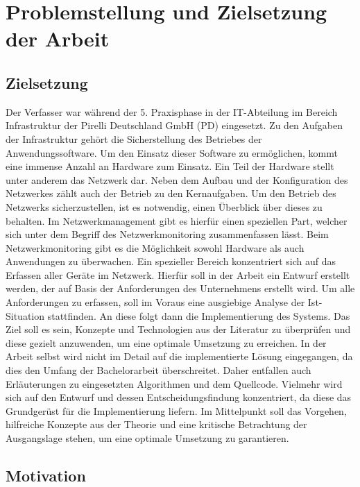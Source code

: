 \chapter{Problemstellung und Zielsetzung der Arbeit}
\label{cha:Einleitung}

\section{Zielsetzung}

Der Verfasser war während der 5. Praxisphase in der IT-Abteilung im Bereich Infrastruktur der Pirelli Deutschland GmbH (PD) eingesetzt.
Zu den Aufgaben der Infrastruktur gehört die Sicherstellung des Betriebes der Anwendungssoftware.
Um den Einsatz dieser Software zu ermöglichen, kommt eine immense Anzahl an Hardware zum Einsatz.
Ein Teil der Hardware stellt unter anderem das Netzwerk dar.
Neben dem Aufbau und der Konfiguration des Netzwerkes zählt auch der Betrieb zu den Kernaufgaben.
Um den Betrieb des Netzwerks sicherzustellen, ist es notwendig, einen Überblick über dieses zu behalten.
Im Netzwerkmanagement gibt es hierfür einen speziellen Part, welcher sich unter dem Begriff des Netzwerkmonitoring zusammenfassen lässt.
Beim Netzwerkmonitoring gibt es die Möglichkeit sowohl Hardware als auch Anwendungen zu überwachen.
Ein spezieller Bereich konzentriert sich auf das Erfassen aller Geräte im Netzwerk.
Hierfür soll in der Arbeit ein Entwurf erstellt werden, der auf Basis der Anforderungen des Unternehmens erstellt wird.
Um alle Anforderungen zu erfassen, soll im Voraus eine ausgiebige Analyse der Ist-Situation stattfinden.
An diese folgt dann die Implementierung des Systems.
Das Ziel soll es sein, Konzepte und Technologien aus der Literatur zu überprüfen und diese gezielt anzuwenden, um eine optimale Umsetzung zu erreichen. 
In der Arbeit selbst wird nicht im Detail auf die implementierte Lösung eingegangen, da dies den Umfang der Bachelorarbeit überschreitet.
Daher entfallen auch Erläuterungen zu eingesetzten Algorithmen und dem Quellcode.
Vielmehr wird sich auf den Entwurf und dessen Entscheidungsfindung konzentriert, da diese das Grundgerüst für die Implementierung liefern.
Im Mittelpunkt soll das Vorgehen, hilfreiche Konzepte aus der Theorie und eine kritische Betrachtung der Ausgangslage stehen, um eine optimale Umsetzung zu garantieren.\\


\section{Motivation}

